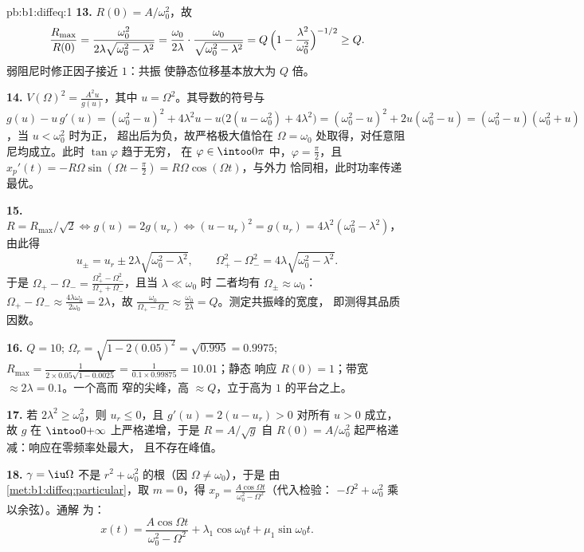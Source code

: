 \begin{solution}{pb:b1:diffeq:1}
\textbf{13.} $R(0) = A/\omega_0^2$，故
\[
\frac{R_{\max}}{R(0)}
= \frac{\omega_0^2}{2\lambda\sqrt{\omega_0^2 - \lambda^2}}
= \frac{\omega_0}{2\lambda}\cdot
\frac{\omega_0}{\sqrt{\omega_0^2 - \lambda^2}}
= Q\,\Bigl(1 - \frac{\lambda^2}{\omega_0^2}\Bigr)^{-1/2}
\geq Q .
\]
弱阻尼时修正因子接近 $1$：共振
使静态位移基本放大为 $Q$ 倍。

\textbf{14.} $V(\Omega)^2 = \frac{A^2 u}{g(u)}$，其中 $u =
\Omega^2$。其导数的符号与 $g(u) - u\,g'(u) =
(\omega_0^2 - u)^2 + 4\lambda^2 u - u\bigl(2(u - \omega_0^2) +
4\lambda^2\bigr) = (\omega_0^2 - u)^2 + 2u(\omega_0^2 - u) =
(\omega_0^2 - u)(\omega_0^2 + u)$，当 $u < \omega_0^2$ 时为正，
超出后为负，故严格极大值恰在 $\Omega =
\omega_0$ 处取得，对任意阻尼均成立。此时 $\tan\varphi$ 趋于无穷，
在 $\varphi \in \intoo0\pi$ 中，$\varphi = \frac\pi2$，且 $x_p'(t) =
-R\Omega\sin(\Omega t - \frac\pi2) = R\Omega\cos(\Omega t)$，与外力
恰同相，此时功率传递最优。

\textbf{15.} $R = R_{\max}/\sqrt2 \iff g(u) = 2g(u_r) \iff (u -
u_r)^2 = g(u_r) = 4\lambda^2(\omega_0^2 - \lambda^2)$，由此得
\[
u_\pm = u_r \pm 2\lambda\sqrt{\omega_0^2 - \lambda^2},
\qquad
\Omega_+^2 - \Omega_-^2 = 4\lambda\sqrt{\omega_0^2 - \lambda^2} .
\]
于是 $\Omega_+ - \Omega_- = \frac{\Omega_+^2 -
\Omega_-^2}{\Omega_+ + \Omega_-}$，且当 $\lambda \ll \omega_0$ 时
二者均有 $\Omega_\pm \approx \omega_0$：$\Omega_+ - \Omega_- \approx
\frac{4\lambda\omega_0}{2\omega_0} = 2\lambda$，故
$\frac{\omega_0}{\Omega_+ - \Omega_-} \approx
\frac{\omega_0}{2\lambda} = Q$。测定共振峰的宽度，
即测得其品质因数。

\textbf{16.} $Q = 10$; $\Omega_r = \sqrt{1 - 2(0.05)^2} =
\sqrt{0.995} = 0.9975$; $R_{\max} = \frac1{2 \times 0.05
\sqrt{1 - 0.0025}} = \frac1{0.1 \times 0.99875} = 10.01$；静态
响应 $R(0) = 1$；带宽 $\approx 2\lambda = 0.1$。一个高而
窄的尖峰，高 $\approx Q$，立于高为 $1$ 的平台之上。

\textbf{17.} 若 $2\lambda^2 \geq \omega_0^2$，则 $u_r \leq 0$，且
$g'(u) = 2(u - u_r) > 0$ 对所有 $u > 0$ 成立，故 $g$ 在
$\intoo0{+\infty}$ 上严格递增，于是 $R = A/\sqrt g$ 自
$R(0) = A/\omega_0^2$ 起严格递减：响应在零频率处最大，
且不存在峰值。

\textbf{18.} $\gamma = \iu\Omega$ 不是 $r^2 +
\omega_0^2$ 的根（因 $\Omega \neq \omega_0$），于是
由\cref{met:b1:diffeq:particular}，取 $m = 0$，得 $x_p =
\frac{A\cos\Omega t}{\omega_0^2 - \Omega^2}$（代入检验：
$-\Omega^2 + \omega_0^2$ 乘以余弦）。通解
为：
\[
x(t) = \frac{A\cos\Omega t}{\omega_0^2 - \Omega^2}
+ \lambda_1\cos\omega_0 t + \mu_1\sin\omega_0 t .
\]


\end{solution}
